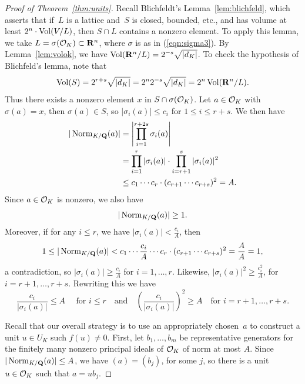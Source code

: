 \begin{proof}[Proof of Theorem~\ref{thm:units}]
Recall Blichfeldt's Lemma~\ref{lem:blichfeld}, which asserts  
that if~$L$ is a lattice and~$S$ is closed,
bounded, etc., and has volume at least $2^n\cdot \operatorname{Vol}(V/L)$, then
$S\cap L$ contains a nonzero element.   To apply this lemma, we
take $L=\sigma(\mathcal{O}_K)\subset \mathbf{R}^n$, where $\sigma$ is as in (\ref{eqn:sigma3}).
By Lemma~\ref{lem:volok}, 
we have
$\operatorname{Vol}(\mathbf{R}^n/L) = 2^{-s}\sqrt{|d_K|}$.  To check the hypothesis
of Blichfeld's lemma, note that 
$$
 \operatorname{Vol}(S) = 2^{r+s} \sqrt{|d_K|} = 2^n 2^{-s} \sqrt{|d_K|} = 2^n \operatorname{Vol}(\mathbf{R}^n/L).
$$
Thus there exists a nonzero element $x$ in $S\cap \sigma(\mathcal{O}_K)$.
Let $a\in \mathcal{O}_K$ with $\sigma(a)=x$, then $\sigma(a)\in S$, so
$|\sigma_i(a)|\leq c_i$ for $1\leq i\leq r+s$.
We then have
\begin{align*}
  |\operatorname{Norm}_{K/\mathbf{Q}}(a)| &=
   \left|\prod_{i=1}^{r+2s} \sigma_i(a)\right|\\
   &=  \prod_{i=1}^r |\sigma_i(a)|\cdot \prod_{i=r+1}^s|\sigma_i(a)|^2\\
   &\leq c_1\cdots c_r\cdot (c_{r+1}\cdots c_{r+s})^2 = A.
\end{align*}
Since $a\in \mathcal{O}_K$ is nonzero, we also have
$$
 |\operatorname{Norm}_{K/\mathbf{Q}}(a)|\geq 1.
$$
Moreover, if for any $i\leq r$, we have $|\sigma_i(a)|< \frac{c_i}{A}$, then 
$$
 1\leq |\operatorname{Norm}_{K/\mathbf{Q}}(a)| < c_1\cdots \frac{c_i}{A}\cdots c_r \cdot (c_{r+1}\cdots c_{r+s})^2 = \frac{A}{A} = 1,
$$
a contradiction, so $|\sigma_i(a)|\geq \frac{c_i}{A}$ for $i=1,\ldots, r$. Likewise,
$|\sigma_i(a)|^2 \geq \frac{c_i^2}{A}$, for $i=r+1,\ldots, r+s$. 
Rewriting this 
we have 
\begin{equation}\label{eqn:cisigbound}
  \frac{c_i}{|\sigma_i(a)|}\leq A\quad\text{ for }i\leq r\quad\text{and}\quad
\left(\frac{c_i}{|\sigma_i(a)|}\right)^2\geq A\quad\text{for } i=r+1,\ldots, r+s.
\end{equation}

Recall that our overall strategy is to use an appropriately chosen~$a$
to construct a unit $u\in U_K$ such $f(u)\neq 0$.  First, let
$b_1,\ldots, b_m$ be representative generators for the finitely many
nonzero principal ideals of $\mathcal{O}_K$ of norm at most $A$.  Since
$|\operatorname{Norm}_{K/\mathbf{Q}}(a)|\leq A$, we have $(a)=(b_j)$, for some $j$, so there
is a unit~$u\in \mathcal{O}_K$ such that $a=u b_j$.


\end{proof}
